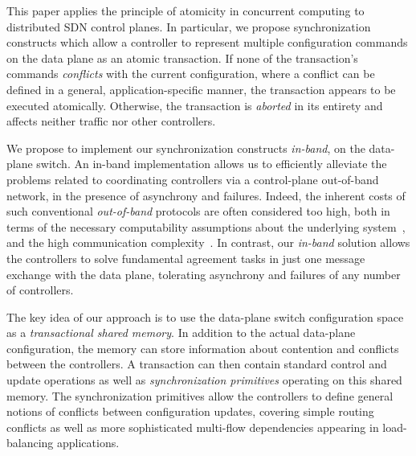 \documentclass[conference]{sigcomm-alternate}
\newcommand{\liron}[1]{\textit{\textcolor{mypurple}{[liron]: #1}}} %
\begin{document}
This paper applies the principle of atomicity in concurrent computing
to distributed SDN control planes.
%
In particular, we propose synchronization constructs which
allow a controller to represent multiple configuration commands on
the data plane as an atomic transaction.
%
If none of the transaction's commands \emph{conflicts}  with the current
configuration, where a conflict can be
defined in a general, application-specific manner, the transaction appears to be executed atomically.
Otherwise, the transaction is \emph{aborted} in its entirety and 
affects neither traffic nor other controllers.

We propose to implement our synchronization constructs \emph{in-band},
on the data-plane switch.
An in-band implementation allows us to efficiently alleviate the problems related to
coordinating controllers via a control-plane
out-of-band network, in the presence of asynchrony and failures.
Indeed, the inherent costs  of such conventional \emph{out-of-band} 
protocols are often considered too high, both in
terms of the necessary computability assumptions about the underlying
system~\cite{FLP85}, and the high communication
complexity~\cite{Lam06}.
In contrast, our \emph{in-band} solution allows the
controllers to solve fundamental agreement tasks in just one message
exchange 
with the data plane, tolerating asynchrony and failures of
any number of controllers.

The key idea of our approach is to use the data-plane switch configuration space
as a \emph{transactional shared memory}.
In addition to the actual data-plane configuration, the memory can store information about  contention and conflicts
between the controllers.
A transaction can then contain standard control and update operations
as well as  \emph{synchronization primitives} operating on this shared
memory.
The synchronization primitives allow the controllers to define
general notions of conflicts between configuration updates,
covering simple routing conflicts 
as well as more sophisticated multi-flow dependencies appearing in load-balancing applications.   
\end{document}
